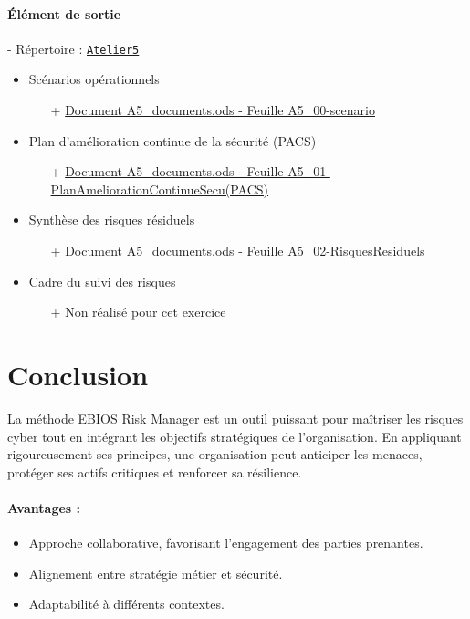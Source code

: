 \documentclass[french, 12pt]{article}%
\newcommand{\itemE}{\item[$\bullet$]}
\begin{document}
\paragraph{Élément de sortie} - Répertoire : \href{run:./ressource_eleve/Atelier5/}{\verb?Atelier5?}
\begin{itemize}
    \itemE Scénarios opérationnels
    	\begin{itemize}
		\item[+] \href{run:./ressource_eleve/Atelier5/A5_documents.ods'}{Document A5\_documents.ods - Feuille A5\_00-scenario}		
		\end{itemize}
	\itemE Plan d’amélioration continue de la sécurité (PACS) 
		\begin{itemize}
		\item[+]  \href{run:./ressource_eleve/Atelier5/A5_documents.ods}{Document A5\_documents.ods - Feuille A5\_01-PlanAmeliorationContinueSecu(PACS)}
		\end{itemize}
	\itemE Synthèse des risques résiduels
		\begin{itemize}
		\item[+] \href{run:./ressource_eleve/Atelier5/A5_documents.ods}{Document A5\_documents.ods - Feuille A5\_02-RisquesResiduels}		
		\end{itemize}
	\itemE Cadre du suivi des risques
		\begin{itemize}
		\item[+]Non réalisé pour cet exercice
		\end{itemize}
	
\end{itemize}






\section{Conclusion}

La méthode EBIOS Risk Manager est un outil puissant pour maîtriser les risques cyber tout en intégrant les objectifs stratégiques de l'organisation. En appliquant rigoureusement ses principes, une organisation peut anticiper les menaces, protéger ses actifs critiques et renforcer sa résilience.

\paragraph{Avantages :}
\begin{itemize}
    \itemE Approche collaborative, favorisant l'engagement des parties prenantes.
    \itemE Alignement entre stratégie métier et sécurité.
    \itemE Adaptabilité à différents contextes.
\end{itemize}
\end{document}
